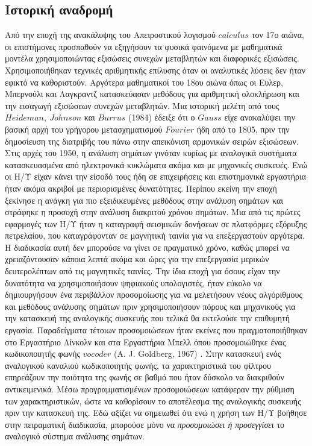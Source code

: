 \documentclass[breaklines=true, 12pt]{article}
\begin{document}
\subsection{Ιστορική αναδρομή}
\label{sec:org5ccde75}
Από την εποχή της ανακάλυψης του Απειροστικού λογισμού \(calculus\)
τον 17ο αιώνα, οι επιστήμονες προσπαθούν να εξηγήσουν τα φυσικά
φαινόμενα με μαθηματικά μοντέλα χρησιμοποιώντας εξισώσεις
συνεχών μεταβλητών και διαφορικές εξισώσεις. Χρησιμοποιήθηκαν
τεχνικές αριθμητικής επίλυσης όταν οι αναλυτικές λύσεις δεν
ήταν εφικτό να καθοριστούν. Αργότερα μαθηματικοί του 18ου αιώνα
όπως οι Ευλερ, Μπερνούλι και Λαγκραντζ κατασκεύασαν μεθόδους
για αριθμητική ολοκλήρωση και την εισαγωγή εξισώσεων συνεχών
μεταβλητών. Μια ιστορική μελέτη από τους \(Heideman,\ Johnson\) και
\({Burrus}\) (1984) έδειξε ότι ο \({Gauss}\) είχε ανακαλύψει την βασική
αρχή του γρήγορου μετασχηματισμού \({Fourier}\) ήδη από το 1805, πριν
την δημοσίευση της διατριβής του πάνω στην απεικόνιση
αρμονικών σειρών εξισώσεων.
Στις αρχές του 1950, η ανάλυση σημάτων γινόταν κυρίως με
αναλογικά συστήματα κατασκευασμένα από ηλεκτρονικά κυκλώματα
ακόμα και με μηχανικές συσκευές. Ενώ οι Η/Υ είχαν κάνει την
είσοδό τους ήδη σε επιχειρήσεις και επιστημονικά εργαστήρια
ήταν ακόμα ακριβοί με περιορισμένες δυνατότητες. Περίπου εκείνη
την εποχή ξεκίνησε η ανάγκη για πιο εξειδικευμένες μεθόδους
στην ανάλυση σημάτων και στράφηκε η προσοχή στην ανάλυση
διακριτού χρόνου σημάτων. Μια από τις πρώτες εφαρμογές των Η/Υ
ήταν η καταγραφή σεισμικών δονήσεων σε πλατφόρμες εξόρυξης
πετρελαίου, που καταγράφονταν σε μαγνητική ταινία για να επεξεργαστούν
αργότερα. Η διαδικασία αυτή δεν μπορούσε να γίνει σε
πραγματικό χρόνο, καθώς μπορεί να χρειαζόντουσαν κάποια
λεπτά ακόμα και ώρες για την επεξεργασία μερικών δευτερολέπτων
από τις μαγνητικές ταινίες.
    Την ίδια εποχή για όσους είχαν την δυνατότητα να χρησιμοποιήσουν
ψηφιακούς υπολογιστές, ήταν εύκολο να δημιουργήσουν ένα περιβάλλον
προσομοίωσης για να μελετήσουν νέους αλγόριθμους και μεθόδους
ανάλυσης σημάτων πριν χρησιμοποιήσουν πόρους και μηχανικούς για την
κατασκευή της αναλογικής συσκευής που τελικά θα εκτελούσε την
επιθυμητή εργασία. Παραδείγματα τέτοιων προσομοιώσεων ήταν εκείνες
που πραγματοποιήθηκαν στο Εργαστήριο Λίνκολν και στα Εργαστήρια Μπελλ
όπου προσομοιώθηκε ένας κωδικοποιητής φωνής \({vocoder}\) 
(A. J. Goldberg, 1967) .
Στην κατασκευή ενός αναλογικού καναλιού κωδικοποιητής φωνής, τα χαρακτηριστικά του
φίλτρου επηρεάζουν την ποιότητα της φωνής σε βαθμό που ήταν δύσκολο να
διακριθούν αντικειμενικά. Μέσω προγραμματισμένων προσομοιώσεων
κατάφεραν την ρύθμιση των χαρακτηριστικών, ώστε να καθορίσουν το
αποτέλεσμα της αναλογικής συσκευής πριν την κατασκευή της.
    Εδώ αξίζει να σημειωθεί ότι ενώ η χρήση των Η/Υ βοήθησε στην πειραματική
διαδικασία, μπορούσε μόνο να \emph{προσομοιώσει ή προσεγγίσει} το αναλογικό
σύστημα ανάλυσης σημάτων.
\end{document}
